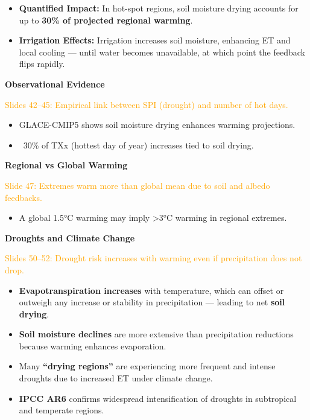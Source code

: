 \documentclass[fontsize=8pt, a4paper, landscape, fleqn]{scrartcl}
\renewcommand{\subsection}[1]{%
    \noindent\colorbox{subsectioncolor}{%
        \parbox{\dimexpr\columnwidth-2\fboxsep}{\color{white}\textbf{#1}}}%
    \vspace{0.5mm}%
}
\begin{document}
\begin{multicols*}{3}[\raggedcolumns]
\begin{itemize}
    \item \textbf{Quantified Impact:} In hot-spot regions, soil moisture drying accounts for up to \textbf{30\% of projected regional warming}.

    \item \textbf{Irrigation Effects:} Irrigation increases soil moisture, enhancing ET and local cooling — until water becomes unavailable, at which point the feedback flips rapidly.
\end{itemize}

\subsection{Observational Evidence}
\noindent \textcolor{orange}{Slides 42–45: Empirical link between SPI (drought) and number of hot days.}

\begin{itemize}
    \item GLACE-CMIP5 shows soil moisture drying enhances warming projections.
    \item ~30\% of TXx (hottest day of year) increases tied to soil drying.
\end{itemize}

\subsection{Regional vs Global Warming}
\noindent \textcolor{orange}{Slide 47: Extremes warm more than global mean due to soil and albedo feedbacks.}

\begin{itemize}
    \item A global 1.5°C warming may imply >3°C warming in regional extremes.
\end{itemize}

\subsection{Droughts and Climate Change}
\noindent \textcolor{orange}{Slides 50–52: Drought risk increases with warming even if precipitation does not drop.}

\begin{itemize}
    \item \textbf{Evapotranspiration increases} with temperature, which can offset or outweigh any increase or stability in precipitation — leading to net \textbf{soil drying}.
    \item \textbf{Soil moisture declines} are more extensive than precipitation reductions because warming enhances evaporation.
    \item Many \textbf{“drying regions”} are experiencing more frequent and intense droughts due to increased ET under climate change.
    \item \textbf{IPCC AR6} confirms widespread intensification of droughts in subtropical and temperate regions.
\end{itemize}


\end{multicols*}
\end{document}
